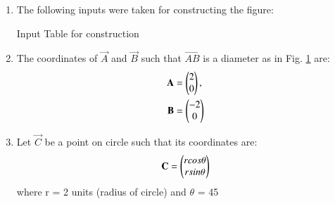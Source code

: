 \renewcommand{\theequation}{\theenumi}
\begin{enumerate}[label=\thesection.\arabic*.,ref=\thesection.\theenumi]

\begin{figure}[!ht]
\centering
\resizebox{\columnwidth}{!}{}
\caption{Using Latex-Tikz}
\label{fig:circle_latex}	
\end{figure}
%
%
%
\item The following inputs were taken for constructing the figure:
%
\begin{table}[ht!]
\centering

\caption{Input Table for construction}
\label{table:table1}	
\end{table}
\item The coordinates of  $\vec{A}$ and  $\vec{B}$ such that  $\vec{AB}$ is a diameter as in Fig. \ref{fig:circle_latex} are:
\\
%
\begin{align}
\mathbf{A} &= \begin{pmatrix}2\\0\end{pmatrix} ,
\label{eq:constr_a}
\\
 \mathbf{B} &= \begin{pmatrix}-2\\0\end{pmatrix} 
\label{eq:constr_b}
\end{align}

\item 
Let $\vec{C}$ be a point on circle such that its coordinates are:
\begin{align}
\mathbf{C}= \begin{pmatrix}rcos\theta\\rsin\theta\end{pmatrix}
\label{eq:constr_cgen}
\end{align}
where r = 2 units (radius of circle) and $\theta$ = 45\degree \\


\end{enumerate}
